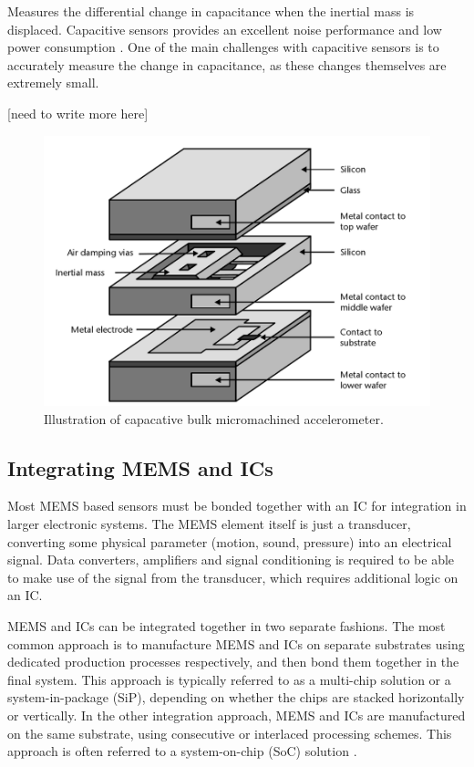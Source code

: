 Measures the differential change in capacitance when the inertial mass is displaced. Capacitive sensors provides an excellent noise performance and low power consumption \cite[p.~91]{kaajakari09}. One of the main challenges with capacitive sensors is to accurately measure the change in capacitance, as these changes themselves are extremely small. 

[need to write more here]

\begin{figure}[h]
\centering
\includegraphics[scale=0.3]{fig/bulk_micromachined.png}
\caption{Illustration of capacative bulk micromachined accelerometer. \cite[p.~100]{maluf04}}
\label{fig:bulk_micromachined}
\end{figure}

\subsection{Integrating MEMS and ICs}

Most MEMS based sensors must be bonded together with an IC for integration in larger electronic systems. The MEMS element itself is just a transducer, converting some physical parameter (motion, sound, pressure) into an electrical signal. Data converters, amplifiers and signal conditioning is required to be able to make use of the signal from the transducer, which requires additional logic on an IC.  

MEMS and ICs can be integrated together in two separate fashions. The most common approach is to manufacture MEMS and ICs on separate substrates using dedicated production processes respectively, and then bond them together in the final system. This approach is typically referred to as a multi-chip solution or a system-in-package (SiP), depending on whether the chips are stacked horizontally or vertically. In the other integration approach, MEMS and ICs are manufactured on the same substrate, using consecutive or interlaced processing schemes. This approach is often referred to a system-on-chip (SoC) solution \cite{fischer15}. 

